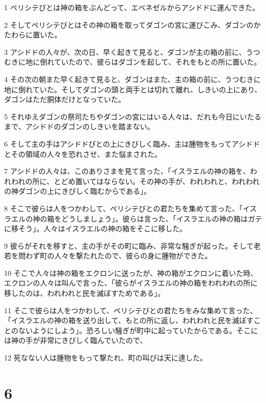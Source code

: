 \par 1 ペリシテびとは神の箱をぶんどって、エベネゼルからアシドドに運んできた。
\par 2 そしてペリシテびとはその神の箱を取ってダゴンの宮に運びこみ、ダゴンのかたわらに置いた。
\par 3 アシドドの人々が、次の日、早く起きて見ると、ダゴンが主の箱の前に、うつむきに地に倒れていたので、彼らはダゴンを起して、それをもとの所に置いた。
\par 4 その次の朝また早く起きて見ると、ダゴンはまた、主の箱の前に、うつむきに地に倒れていた。そしてダゴンの頭と両手とは切れて離れ、しきいの上にあり、ダゴンはただ胴体だけとなっていた。
\par 5 それゆえダゴンの祭司たちやダゴンの宮にはいる人々は、だれも今日にいたるまで、アシドドのダゴンのしきいを踏まない。
\par 6 そして主の手はアシドドびとの上にきびしく臨み、主は腫物をもってアシドドとその領域の人々を恐れさせ、また悩まされた。
\par 7 アシドドの人々は、このありさまを見て言った、「イスラエルの神の箱を、われわれの所に、とどめ置いてはならない。その神の手が、われわれと、われわれの神ダゴンの上にきびしく臨むからである」。
\par 8 そこで彼らは人をつかわして、ペリシテびとの君たちを集めて言った、「イスラエルの神の箱をどうしましょう」。彼らは言った、「イスラエルの神の箱はガテに移そう」。人々はイスラエルの神の箱をそこに移した。
\par 9 彼らがそれを移すと、主の手がその町に臨み、非常な騒ぎが起った。そして老若を問わず町の人々を撃たれたので、彼らの身に腫物ができた。
\par 10 そこで人々は神の箱をエクロンに送ったが、神の箱がエクロンに着いた時、エクロンの人々は叫んで言った、「彼らがイスラエルの神の箱をわれわれの所に移したのは、われわれと民を滅ぼすためである」。
\par 11 そこで彼らは人をつかわして、ペリシテびとの君たちをみな集めて言った、「イスラエルの神の箱を送り出して、もとの所に返し、われわれと民を滅ぼすことのないようにしよう」。恐ろしい騒ぎが町中に起っていたからである。そこには神の手が非常にきびしく臨んでいたので、
\par 12 死なない人は腫物をもって撃たれ、町の叫びは天に達した。

\chapter{6}

